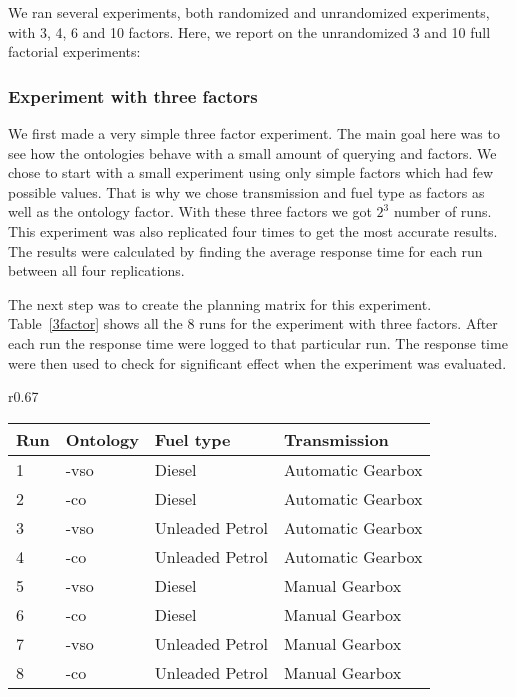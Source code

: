 \documentclass{llncs}
\begin{document}
We ran several experiments, both randomized and unrandomized
experiments, with 3, 4, 6 and 10 factors. Here, we report on the
unrandomized 3 and 10 full factorial experiments:
  
\subsubsection{Experiment with three factors}
We first made a very simple three factor experiment. The main goal here was
to see how the ontologies behave with a small amount of querying and
factors. We chose to start with a small experiment using only
simple factors which had few possible values. That is why we chose
transmission and fuel type as factors as well as the ontology
factor. With these three factors we got $2^3$ number of runs. This
experiment was also replicated four times to get the most accurate
results.  The results were calculated by finding the average response
time for each run between all four replications.

The next step was to create the planning matrix for this
experiment. Table~\ref{3factor} shows all the 8 runs for the
experiment with three factors.  After each run the response time were
logged to that particular run. The response time were then used to
check for significant effect when the experiment was evaluated.

\begin{wraptable}{r}{0.67\textwidth}
\vspace{-20pt}
    \begin{tabular}{ | l | l l l |}
    \hline
    {\bf Run} & {\bf Ontology} & {\bf Fuel type} & {\bf Transmission} \\ \hline
	1 & -vso & Diesel & Automatic Gearbox \\ \hline 
	2 & -co & Diesel & Automatic Gearbox \\ \hline 
	3 & -vso & Unleaded Petrol & Automatic Gearbox \\ \hline 
	4 & -co & Unleaded Petrol & Automatic Gearbox \\ \hline 
	5 & -vso & Diesel & Manual Gearbox \\ \hline 
	6 & -co & Diesel & Manual Gearbox \\ \hline 
	7 & -vso & Unleaded Petrol & Manual Gearbox \\ \hline 
	8 & -co & Unleaded Petrol & Manual Gearbox \\ \hline 
    \end{tabular}
    \caption{Planning matrix for experiment with three factors and
      their levels.}\label{3factor}
\vspace{-20pt}
\end{wraptable}
\end{document}
